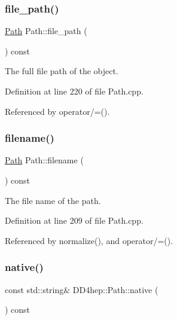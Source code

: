 \subsubsection{\texorpdfstring{file\+\_\+path()}{file\_path()}}
{\footnotesize\ttfamily \hyperlink{class_d_d4hep_1_1_path}{Path} Path\+::file\+\_\+path (\begin{DoxyParamCaption}{ }\end{DoxyParamCaption}) const}



The full file path of the object. 



Definition at line 220 of file Path.\+cpp.



Referenced by operator/=().

\hypertarget{class_d_d4hep_1_1_path_a07842fab1e11e853dad5bab7f1b3a073}{}\label{class_d_d4hep_1_1_path_a07842fab1e11e853dad5bab7f1b3a073} 
\subsubsection{\texorpdfstring{filename()}{filename()}}
{\footnotesize\ttfamily \hyperlink{class_d_d4hep_1_1_path}{Path} Path\+::filename (\begin{DoxyParamCaption}{ }\end{DoxyParamCaption}) const}



The file name of the path. 



Definition at line 209 of file Path.\+cpp.



Referenced by normalize(), and operator/=().

\hypertarget{class_d_d4hep_1_1_path_a866a065576f37fffcb67e717e1a94fdc}{}\label{class_d_d4hep_1_1_path_a866a065576f37fffcb67e717e1a94fdc} 
\subsubsection{\texorpdfstring{native()}{native()}}
{\footnotesize\ttfamily const std\+::string\& D\+D4hep\+::\+Path\+::native (\begin{DoxyParamCaption}{ }\end{DoxyParamCaption}) const\hspace{0.3cm}{\ttfamily [inline]}}



